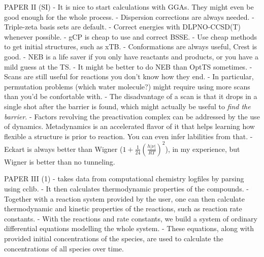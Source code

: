 PAPER II (SI)
- It is nice to start calculations with GGAs.
They might even be good enough for the whole process.
- Dispersion corrections are always needed.
- Triple-zeta basis sets are default.
- Correct energies with DLPNO-CCSD(T) whenever possible.
- gCP is cheap to use and correct BSSE.
- Use cheap methods to get initial structures,
such as xTB.
- Conformations are always useful,
Crest is good.
- NEB is a life saver if you only have reactants and products,
or you have a mild guess at the TS.
- It might be better to do NEB than OptTS sometimes.
- Scans are still useful for reactions you don't know how they end.
- In particular,
permutation problems (which water molecule?) might require
using more scans than you'd be confortable with.
- The disadvantage of a scan is that it drops in a single shot
after the barrier is found,
which might actually be useful
to \emph{find the barrier}.
- Factors revolving the preactivation complex can be
addressed by the use of dynamics.
Metadynamics is an accelerated flavor of it that
helps learning how flexible a structure is prior to reaction.
You can even infer labilities from that.
- Eckart is always better than
Wigner ($1 + \frac{1}{24} \left( \frac{h |\nu|}{R T} \right)^2$),
in my experience,
but Wigner is better than no tunneling.

PAPER III (1)
- \overreact{} takes data from computational chemistry logfiles by parsing using cclib.
- It then calculates thermodynamic properties of the compounds.
- Together with a reaction system provided by the user,
one can then calculate thermodynamic and kinetic properties of the reactions,
such as reaction rate constants.
- With the reactions and rate constants,
we build a system of ordinary differential equations
modelling the whole system.
- These equations,
along with provided initial concentrations of the species,
are used to calculate the concentrations of all species over time.

